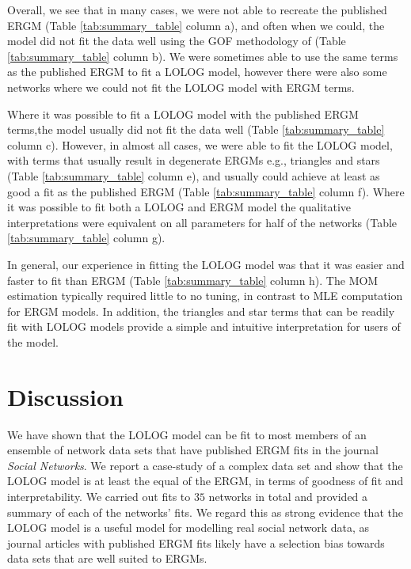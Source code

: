 \documentclass[
]{statsoc}
\begin{document}
Overall, we see that in many cases, we were not able to recreate the
published ERGM (Table \ref{tab:summary_table} column a), and often when
we could, the model did not fit the data well using the GOF methodology
of \cite{Hunter_Goodreau_2008} (Table \ref{tab:summary_table} column b).
We were sometimes able to use the same terms as the published ERGM to
fit a LOLOG model, however there were also some networks where we could
not fit the LOLOG model with ERGM terms.

Where it was possible to fit a LOLOG model with the published ERGM
terms,the model usually did not fit the data well (Table
\ref{tab:summary_table} column c). However, in almost all cases, we were
able to fit the LOLOG model, with terms that usually result in
degenerate ERGMs e.g., triangles and stars (Table
\ref{tab:summary_table} column e), and usually could achieve at least as
good a fit as the published ERGM (Table \ref{tab:summary_table} column
f). Where it was possible to fit both a LOLOG and ERGM model the
qualitative interpretations were equivalent on all parameters for half
of the networks (Table \ref{tab:summary_table} column g).

In general, our experience in fitting the LOLOG model was that it was
easier and faster to fit than ERGM (Table \ref{tab:summary_table} column
h). The MOM estimation typically required little to no tuning, in
contrast to MLE computation for ERGM models. In addition, the triangles
and star terms that can be readily fit with LOLOG models provide a
simple and intuitive interpretation for users of the model.

\section{Discussion}\label{sec:discussion}

We have shown that the LOLOG model can be fit to most members of an
ensemble of network data sets that have published ERGM fits in the
journal \textit{Social Networks}. We report a case-study of a complex
data set and show that the LOLOG model is at least the equal of the
ERGM, in terms of goodness of fit and interpretability. We carried out
fits to \(35\) networks in total and provided a summary of each of the
networks' fits. We regard this as strong evidence that the LOLOG model
is a useful model for modelling real social network data, as journal
articles with published ERGM fits likely have a selection bias towards
data sets that are well suited to ERGMs.
\end{document}
